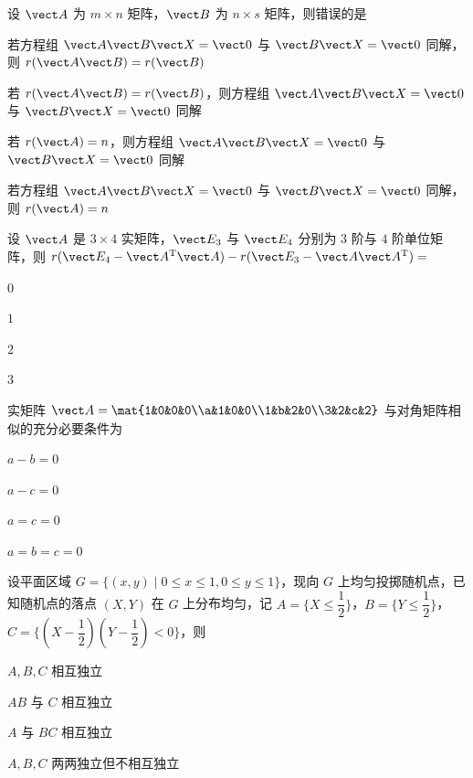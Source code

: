 \begin{question}[index=5]
设 $\vect A$ 为 $m\times n$ 矩阵，$\vect B$ 为 $n\times s$ 矩阵，则错误的是
\begin{choices}[columns=1]
\item 若方程组 $\vect A\vect B\vect X=\vect0$ 与 $\vect B\vect X=\vect0$ 同解，则 $r(\vect A\vect B)=r(\vect B)$
\item 若 $r(\vect A\vect B)=r(\vect B)$，则方程组 $\vect A\vect B\vect X=\vect0$ 与 $\vect B\vect X=\vect0$ 同解
\item 若 $r(\vect A)=n$，则方程组 $\vect A\vect B\vect X=\vect0$ 与 $\vect B\vect X=\vect0$ 同解
\item 若方程组 $\vect A\vect B\vect X=\vect0$ 与 $\vect B\vect X=\vect0$ 同解，则 $r(\vect A)=n$
\end{choices}
\end{question}
\QuestionBreak

\begin{question}[index=6]
设 $\vect A$ 是 $3\times4$ 实矩阵，$\vect E_3$ 与 $\vect E_4$ 分别为 $3$ 阶与 $4$ 阶单位矩阵，则 $r(\vect E_4-\vect A^{\mathrm T}\vect A)-r(\vect E_3-\vect A\vect A^{\mathrm T})=$
\begin{choices}[columns=4]
\item $0$
\item $1$
\item $2$
\item $3$
\end{choices}
\end{question}
\QuestionBreak

\begin{question}[index=7]
实矩阵 $\vect A=\mat{1&0&0&0\\a&1&0&0\\1&b&2&0\\3&2&c&2}$ 与对角矩阵相似的充分必要条件为
\begin{choices}[columns=4]
\item $a-b=0$
\item $a-c=0$
\item $a=c=0$
\item $a=b=c=0$
\end{choices}
\end{question}
\QuestionBreak

\begin{question}[index=8]
设平面区域 $G=\{(x,y)\mid0\le x\le1,0\le y\le1\}$，现向 $G$ 上均匀投掷随机点，已知随机点的落点 $(X,Y)$ 在 $G$ 上分布均匀，记 $A=\{X\le\dfrac12\}$，$B=\{Y\le\dfrac12\}$，$C=\{(X-\dfrac12)(Y-\dfrac12)<0\}$，则
\begin{choices}[columns=2]
\item $A,B,C$ 相互独立
\item $AB$ 与 $C$ 相互独立
\item $A$ 与 $BC$ 相互独立
\item $A,B,C$ 两两独立但不相互独立
\end{choices}
\end{question}
\QuestionBreak

